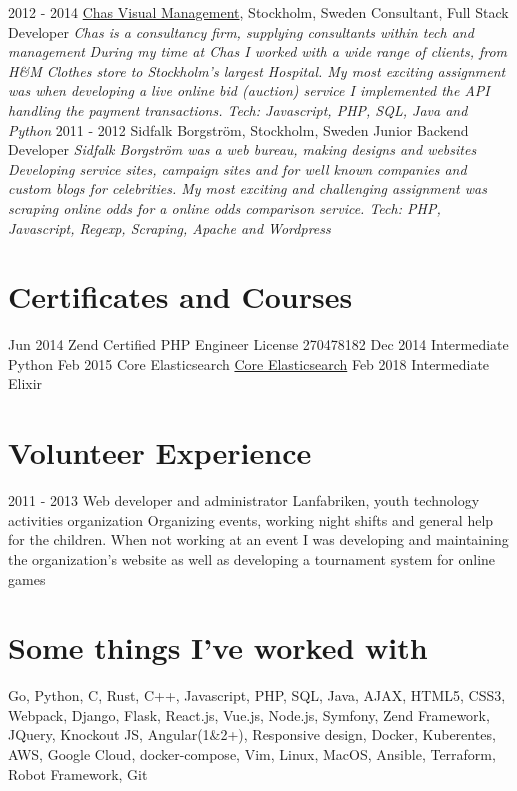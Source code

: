 \documentclass[]{friggeri-cv}
\begin{document}
\begin{entrylist}
  \bigentry
    {2012 - 2014}
    {{\href{https://chas.se/}{Chas Visual Management}}, Stockholm, Sweden} {Consultant, Full Stack Developer}
    {\emph{Chas is a consultancy firm, supplying consultants within tech and management}}
    {\textit{During my time at Chas I worked with a wide range of clients, from H\&M Clothes store to Stockholm's largest Hospital. My most exciting assignment was when developing a live online bid (auction) service I implemented the API handling the payment transactions. Tech: Javascript, PHP, SQL, Java and Python}\newline}
  \bigentry
    {2011 - 2012}
    {Sidfalk Borgström, Stockholm, Sweden} {Junior Backend Developer}
    {\textit{Sidfalk Borgström was a web bureau, making designs and websites}}
    {\emph{Developing service sites, campaign sites and for well known companies and custom blogs for celebrities. My most exciting and challenging assignment was scraping online odds for a online odds comparison service. Tech: PHP, Javascript, Regexp, Scraping, Apache and Wordpress}\newline}
\end{entrylist}

\section{Certificates and Courses}
\begin{entrylist}
  \entry
    {Jun 2014}
    {Zend Certified PHP Engineer}
    {License 270478182}
    {}
  \entry
    {Dec 2014}
    {Intermediate Python}
    {}
    {}
  \entry
    {Feb 2015}
    {Core Elasticsearch}
    {\href{https://training.elastic.co/instructor-led-training/CoreESOperations}{Core Elasticsearch}}
    {}
  \entry
    {Feb 2018}
    {Intermediate Elixir}
    {}
    {}
\end{entrylist}

\section{Volunteer Experience}

\begin{entrylist}
  \entry
    {2011 - 2013}
    {Web developer and administrator}
    {Lanfabriken, youth technology activities organization}
    {Organizing events, working night shifts and general help for the children. When not working at an event I was developing and maintaining the organization's website as well as developing a tournament system for online games}
\end{entrylist}

\section{Some things I've worked with}
 Go, Python, C, Rust, C++, Javascript, PHP, SQL, Java, AJAX, HTML5, CSS3, Webpack, Django, Flask, React.js, Vue.js, Node.js, Symfony, Zend Framework, JQuery, Knockout JS, Angular(1\&2+), Responsive design, Docker, Kuberentes, AWS, Google Cloud, docker-compose, Vim, Linux, MacOS, Ansible, Terraform, Robot Framework, Git
\end{document}
